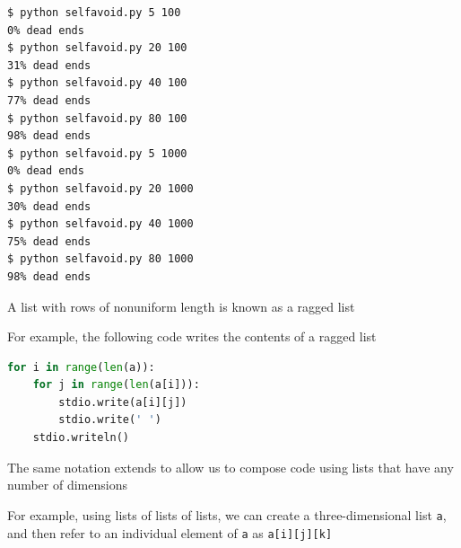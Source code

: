 \documentclass[8pt,a4paper,compress]{beamer}
\begin{document}
\begin{frame}[fragile]
\begin{minipage}{110pt}
\end{minipage}
\end{frame}

\begin{frame}[fragile]
\pause

\begin{lstlisting}[language={}]
$ python selfavoid.py 5 100
0% dead ends
$ python selfavoid.py 20 100
31% dead ends
$ python selfavoid.py 40 100
77% dead ends
$ python selfavoid.py 80 100
98% dead ends
$ python selfavoid.py 5 1000
0% dead ends
$ python selfavoid.py 20 1000
30% dead ends
$ python selfavoid.py 40 1000
75% dead ends
$ python selfavoid.py 80 1000
98% dead ends
\end{lstlisting}
\end{frame}

\begin{frame}[fragile]
\pause

A list with rows of nonuniform length is known as a ragged list

\pause
\bigskip

For example, the following code writes the contents of a ragged list

\begin{lstlisting}[language=Python]
for i in range(len(a)):
    for j in range(len(a[i])):
        stdio.write(a[i][j])
        stdio.write(' ')
    stdio.writeln()
\end{lstlisting}

\pause
\bigskip

The same notation extends to allow us to compose code using lists that have any number of dimensions

\pause
\bigskip

For example, using lists of lists of lists, we can create a three-dimensional list \lstinline{a}, and then refer to an individual element of \lstinline{a} as \lstinline{a[i][j][k]}
\end{frame}
\end{document}

